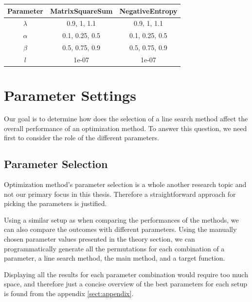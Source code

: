 \documentclass[a4paper,english,titlepage,12pt]{article}
\begin{document}
\begin{table}[H]
\label{tab:params_ArmijoSearch}
\centering
{}
\begin{tabular}{|c|c|c|}
\hline
\rowcolor{gray!25}
Parameter & MatrixSquareSum & NegativeEntropy \\
\hline
$\lambda$ & 0.9, 1, 1.1 & 0.9, 1, 1.1 \\
$\alpha$ & 0.1, 0.25, 0.5 & 0.1, 0.25, 0.5 \\
$\beta$ & 0.5, 0.75, 0.9 & 0.5, 0.75, 0.9 \\
$l$ & 1e-07 & 1e-07 \\
\hline
\end{tabular}
\end{table}


\section{Parameter Settings}


Our goal is to determine how does the selection of a line search method affect the overall performance of an optimization method. To answer this question, we need first to consider the role of the different parameters.

\subsection{Parameter Selection}
\label{sect:parameter_selection}

Optimization method's parameter selection is a whole another research topic and not our primary focus in this thesis. Therefore a straightforward approach for picking the parameters is justified.

Using a similar setup as when comparing the performances of the methods, we can also compare the outcomes with different parameters. Using the manually chosen parameter values presented in the theory section, we can programmatically generate all the permutations for each combination of a parameter, a line search method, the main method, and a target function.

Displaying all the results for each parameter combination would require too much space, and therefore just a concise overview of the best parameters for each setup is found from the appendix \ref{sect:appendix}.
\end{document}
